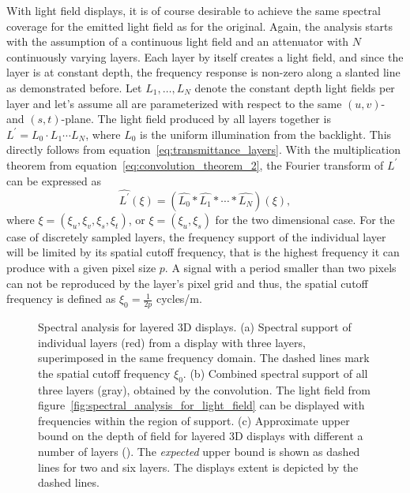 With light field displays, it is of course desirable to achieve the same spectral coverage for the emitted light field as for the original.
Again, the analysis starts with the assumption of a continuous light field and an attenuator with $N$ continuously varying layers.
Each layer by itself creates a light field, and since the layer is at constant depth, the frequency response is non-zero along a slanted line as demonstrated before.
Let $L_1, \dots , L_N$ denote the constant depth light fields per layer and let's assume all are parameterized with respect to the same $(u, v)$- and \mbox{$(s, t)$-plane}.
The light field produced by all layers together is $L^\prime = L_0 \cdot L_1 \cdots L_N$, where $L_0$ is the uniform illumination from the backlight.
This directly follows from equation~\ref{eq:transmittance_layers}.
With the multiplication theorem from equation~\ref{eq:convolution_theorem_2}, the Fourier transform of $L^\prime$ can be expressed as
\begin{equation}\label{eq:convolution_of_layers}
	\widehat{L^\prime}(\xi) = (\widehat{L_0} \ast \widehat{L_1} \ast \cdots \ast \widehat{L_N}) (\xi), 
\end{equation}
where $\xi = (\xi_u, \xi_v, \xi_s, \xi_t)$, or $\xi = (\xi_u, \xi_s)$ for the two dimensional case.
For the case of discretely sampled layers, the frequency support of the individual layer will be limited by its spatial cutoff frequency, that is the highest frequency it can produce with a given pixel size $p$.
A signal with a period smaller than two pixels can not be reproduced by the layer's pixel grid and thus, the spatial cutoff frequency is defined as $\xi_0 = \frac{1}{2p}$ cycles/m.
\begin{figure}[tb]
	\begin{subfigure}[b]{.32\textwidth}
		\centering
		
		\caption{}
		\label{fig:3_layers}
		
		\caption{}
		\label{fig:3_layes_convolution}
	\end{subfigure}%
	\hfill
	\begin{subfigure}[b]{.68\textwidth}
		\centering
		
		\caption{}
		\label{fig:cut-off-frequency_N_layers}
	\end{subfigure}%
	\caption[Spectral analysis for layered 3D displays]
			{Spectral analysis for layered 3D displays. 
			 (a) Spectral support of individual layers (red) from a display with three layers, superimposed in the same frequency domain.
				 The dashed lines mark the spatial cutoff frequency $\xi_0$.
			 (b) Combined spectral support of all three layers (gray), obtained by the convolution. 
				 The light field from figure~\ref{fig:spectral_analysis_for_light_field} can be displayed with frequencies within the region of support.
			 (c) Approximate upper bound on the depth of field for layered 3D displays with different a number of layers (\cite{WetzsteinTomo}).
				 The \emph{expected} upper bound is shown as dashed lines for two and six layers.
				 The displays extent is depicted by the dashed lines.}
	\label{fig:spectral_analysis_of_display}
\end{figure}
